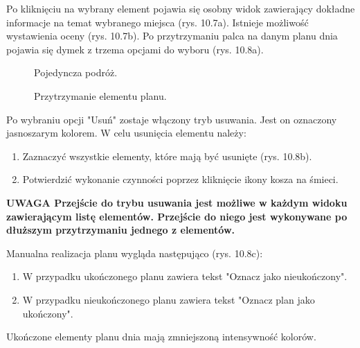 \par Po kliknięciu na wybrany element pojawia się osobny widok zawierający dokładne informacje na temat wybranego miejsca (rys. 10.7a). Istnieje możliwość wystawienia oceny (rys. 10.7b).
Po przytrzymaniu palca na danym planu dnia pojawia się dymek z trzema opcjami do wyboru (rys. 10.8a).

\begin{figure}[h]

\centering
\null\hfill
{}
\hfill
{}
\hfill\null

\caption{Pojedyncza podróż.}
\label{fig:podrecznik4}
\end{figure}
\FloatBarrier

\begin{figure}[h]

\centering
\null\hfill
{}
\hfill
{}
\hfill
{}
\hfill\null

\caption{Przytrzymanie elementu planu.}
\label{fig:podrecznik5}
\end{figure}
\FloatBarrier


Po wybraniu opcji "Usuń" zostaje włączony tryb usuwania.
Jest on oznaczony jasnoszarym kolorem.
W celu usunięcia elementu należy:
\begin{enumerate}
\item Zaznaczyć wszystkie elementy, które mają być usunięte (rys. 10.8b).
\item Potwierdzić wykonanie czynności poprzez kliknięcie ikony kosza na śmieci.
\end{enumerate}
\textbf{UWAGA Przejście do trybu usuwania jest możliwe w każdym widoku zawierającym listę elementów. Przejście do niego jest wykonywane po dłuższym przytrzymaniu jednego z elementów.}



\par Manualna realizacja planu wygląda następująco (rys. 10.8c):
\begin{enumerate}
\item W przypadku ukończonego planu zawiera tekst "Oznacz jako nieukończony".
\item W przypadku nieukończonego planu zawiera tekst "Oznacz plan jako ukończony".
\end{enumerate}
Ukończone elementy planu dnia mają zmniejszoną intensywność kolorów.


